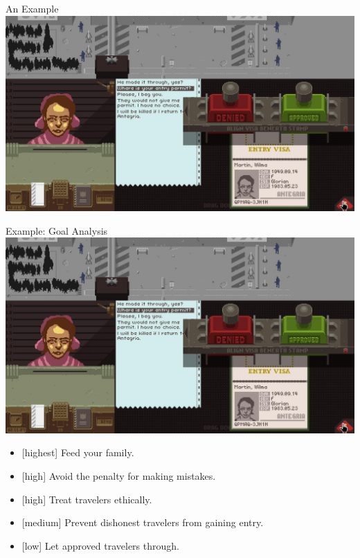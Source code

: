 \documentclass[xcolor=x11names]{beamer}
\begin{document}
\begin{frame}{An Example}
  \centering
  \includegraphics[width=\textwidth]{res/papersplease-large.png} \\
\end{frame}

\begin{frame}{Example: Goal Analysis}
  \centering
  \includegraphics[height=0.3\textheight]{res/papersplease-large.png} \\
  \raggedright
  \begin{itemize}
    \item {[highest] Feed your family.}
    \item {[high] Avoid the penalty for making mistakes.}
    \item {[high] Treat travelers ethically.}
    \item {[medium] Prevent dishonest travelers from gaining entry.}
    \item {[low] Let approved travelers through.}
  \end{itemize}
\end{frame}
\end{document}
